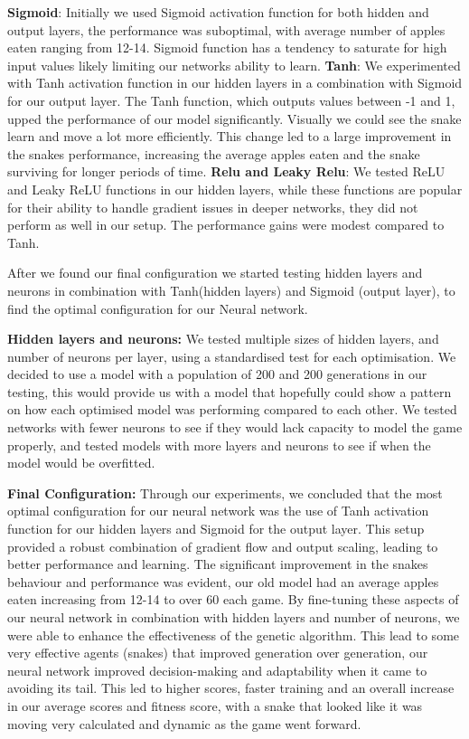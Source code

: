 \documentclass[a4paper, twocolumn]{article}
\begin{document}
\textbf{Sigmoid}: Initially we used Sigmoid activation function for both hidden and output layers, the performance was suboptimal, with average number of apples eaten ranging from 12-14. Sigmoid function has a tendency to saturate for high input values likely limiting our networks ability to learn.
\textbf{Tanh}: We experimented with Tanh activation function in our hidden layers in a combination with Sigmoid for our output layer. The Tanh function, which outputs values between -1 and 1, upped the performance of our model significantly. Visually we could see the snake learn and move a lot more efficiently. This change led to a large improvement in the snakes performance, increasing the average apples eaten and the snake surviving for longer periods of time.
\textbf{Relu and Leaky Relu}: We tested ReLU and Leaky ReLU functions in our hidden layers, while these functions are popular for their ability to handle gradient issues in deeper networks, they did not perform as well in our setup. The performance gains were modest compared to Tanh.

After we found our final configuration we started testing hidden layers and neurons in combination with Tanh(hidden layers) and Sigmoid (output layer), to find the optimal configuration for our Neural network. 


\textbf{Hidden layers and neurons: }
We tested multiple sizes of hidden layers, and number of neurons per layer, using a standardised test for each optimisation. We decided to use a model with a population of 200 and 200 generations in our testing, this would provide us with a model that hopefully could show a pattern on how each optimised model was performing compared to each other. We tested networks with fewer neurons to see if they would lack capacity to model the game properly, and tested models with more layers and neurons to see if when the model would be overfitted. 


\textbf{Final Configuration: }
Through our experiments, we concluded that the most optimal configuration for our neural network was the use of Tanh activation function for our hidden layers and Sigmoid for the output layer. This setup provided a robust combination of gradient flow and output scaling, leading to better performance and learning. The significant improvement in the snakes behaviour and performance was evident, our old model had an average apples eaten increasing from 12-14 to over 60 each game. By fine-tuning these aspects of our neural network in combination with hidden layers and number of neurons, we were able to enhance the effectiveness of the genetic algorithm. This lead to some very effective agents (snakes) that improved generation over generation, our neural network improved decision-making and adaptability when it came to avoiding its tail. This led to higher scores, faster training and an overall increase in our average scores and fitness score, with a snake that looked like it was moving very calculated and dynamic as the game went forward. 
\end{document}
